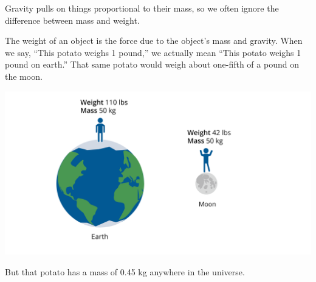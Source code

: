 Gravity pulls on things proportional to their mass, so we often
ignore the difference between mass and weight.

The weight of an object is the force due to the object's mass and
gravity.  When we say, ``This potato weighs 1 pound,'' we actually mean
``This potato weighs 1 pound on earth.''  That same potato would weigh
about one-fifth of a pound on the moon.

\includegraphics[width=1\textwidth]{massvweight.png}

But that potato has a mass of 0.45 kg anywhere in the universe.
